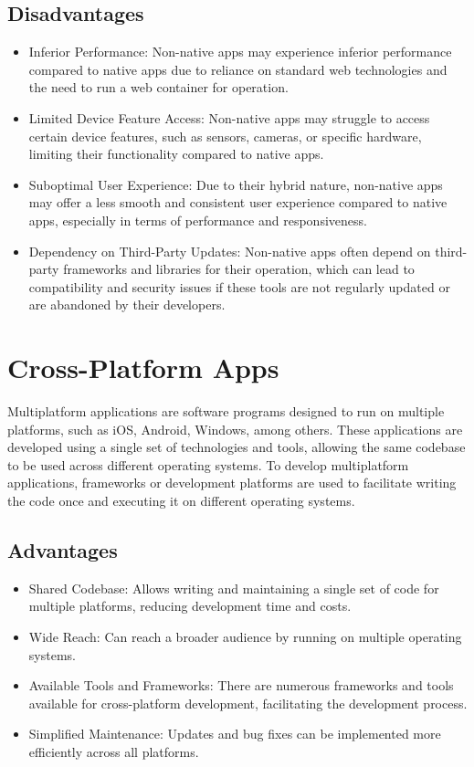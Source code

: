 \documentclass{article}
\begin{document}
\begin{multicols}{2}
		\subsection{Disadvantages }
		
		\begin{itemize}
			\item Inferior Performance: Non-native apps may experience inferior performance compared to native apps due to reliance on standard web technologies and the need to run a web container for operation.
			\item Limited Device Feature Access: Non-native apps may struggle to access certain device features, such as sensors, cameras, or specific hardware, limiting their functionality compared to native apps.
			\item Suboptimal User Experience: Due to their hybrid nature, non-native apps may offer a less smooth and consistent user experience compared to native apps, especially in terms of performance and responsiveness.
			\item Dependency on Third-Party Updates: Non-native apps often depend on third-party frameworks and libraries for their operation, which can lead to compatibility and security issues if these tools are not regularly updated or are abandoned by their developers.
		\end{itemize}
		
		\section{Cross-Platform Apps}
		Multiplatform applications are software programs designed to run on multiple platforms, such as iOS, Android, Windows, among others. These applications are developed using a single set of technologies and tools, allowing the same codebase to be used across different operating systems. To develop multiplatform applications, frameworks or development platforms are used to facilitate writing the code once and executing it on different operating systems.
		
		\subsection{Advantages }
		
		\begin{itemize}
			\item Shared Codebase: Allows writing and maintaining a single set of code for multiple platforms, reducing development time and costs.
			\item Wide Reach: Can reach a broader audience by running on multiple operating systems.
			\item Available Tools and Frameworks: There are numerous frameworks and tools available for cross-platform development, facilitating the development process.
			\item Simplified Maintenance: Updates and bug fixes can be implemented more efficiently across all platforms.
		\end{itemize}
		

\end{multicols}
\end{document}
